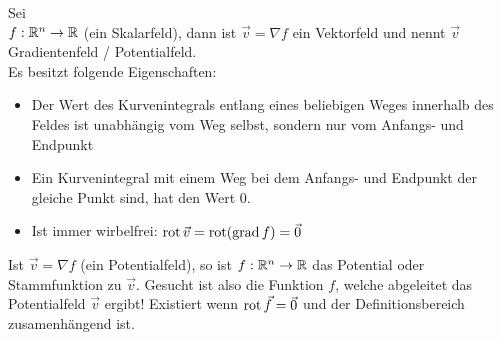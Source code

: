 \begin{definition} Sei\\ 
$f: \mathbb{R}^n \to \mathbb{R}$ (ein Skalarfeld), dann ist $\vec{v} = \nabla f$ ein Vektorfeld und nennt $\vec{v}$
Gradientenfeld / Potentialfeld.\\
Es besitzt folgende Eigenschaften:
\begin{itemize}[leftmargin=0.5cm]
	\item Der Wert des Kurvenintegrals entlang eines beliebigen Weges innerhalb des
	Feldes ist unabhängig vom Weg selbst, sondern nur vom Anfangs- und Endpunkt
	\item Ein Kurvenintegral mit einem Weg bei dem Anfangs- und Endpunkt der
	gleiche Punkt sind, hat den Wert 0.
	\item Ist immer wirbelfrei: $\operatorname{rot} \vec{v} = \operatorname{rot}(\operatorname{grad} f) = \vec{0}$
\end{itemize}
\end{definition}

\begin{definition}[Potential]
Ist $\vec{v} = \nabla f$ (ein Potentialfeld), so ist $f: \mathbb{R}^n \to \mathbb{R}$ das Potential oder Stammfunktion zu $\vec{v}$. Gesucht ist also die Funktion $f$, welche abgeleitet das Potentialfeld $\vec{v}$ ergibt!
Existiert wenn $\operatorname{rot} \vec{f} = \vec{0}$ und der Definitionsbereich zusamenhängend ist.
\end{definition}

